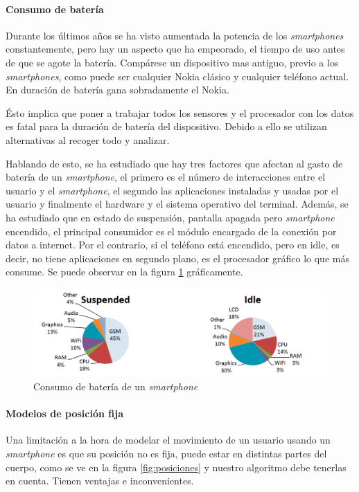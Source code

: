\documentclass[12pt]{book}
\numberwithin{equation}{section}
\begin{document}
\paragraph{Consumo de batería}
Durante los últimos años se ha visto aumentada la potencia de los \textit{smartphones} constantemente, pero hay un aspecto que ha empeorado, el tiempo de uso antes de que se agote la batería. Compárese un dispositivo mas antiguo, previo a los \textit{smartphones}, como puede ser cualquier Nokia clásico y cualquier teléfono actual. En duración de batería gana sobradamente el Nokia. 

Ésto implica que poner a trabajar todos los sensores y el procesador con los datos es fatal para la duración de batería del dispositivo. Debido a ello se utilizan alternativas al recoger todo y analizar. 

Hablando de esto, se ha estudiado que hay tres factores que afectan al gasto de batería de un \textit{smartphone}, el primero es el número de interacciones entre el usuario y el \textit{smartphone}, el segundo las aplicaciones instaladas y usadas por el usuario y finalmente el hardware y el sistema operativo del terminal\cite{Falaki:2010:DSU:1814433.1814453}. Además, se ha estudiado que en estado de suspensión, pantalla apagada pero \textit{smartphone} encendido, el principal consumidor es el módulo encargado de la conexión por datos a internet. Por el contrario, si el teléfono está encendido, pero en idle, es decir, no tiene aplicaciones en segundo plano, es el procesador gráfico lo que más consume\cite{Carroll:2010:APC:1855840.1855861}. Se puede observar en la figura \ref{fig:consumo} gráficamente.
\begin{figure}[h]
    \centering
    \includegraphics[width=1\textwidth]{batterylife.png}
    \caption{Consumo de batería de un \textit{smartphone}\cite{Carroll:2010:APC:1855840.1855861}}
    \label{fig:consumo}
\end{figure}

\paragraph{Modelos de posición fija}
Una limitación a la hora de modelar el movimiento de un usuario usando un \textit{smartphone} es que su posición no es fija, puede estar en distintas partes del cuerpo, como se ve en la figura \ref{fig:posiciones} y nuestro algoritmo debe tenerlas en cuenta. Tienen ventajas e inconvenientes. 
\end{document}

